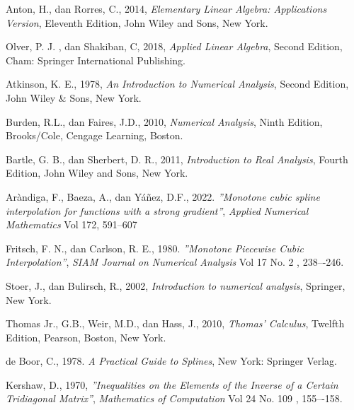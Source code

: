 \documentclass{skripsimathugm}
\begin{document}
\begin{thebibliography}{99}

Anton, H., dan Rorres, C., 2014, \emph{Elementary Linear Algebra: Applications Version}, Eleventh Edition, John Wiley and Sons, New York.

Olver, P. J. , dan Shakiban, C, 2018, \emph{Applied Linear Algebra}, Second Edition, Cham: Springer International Publishing.

Atkinson, K. E., 1978, \emph{An Introduction to Numerical Analysis}, Second Edition, John Wiley \& Sons, New York.

Burden, R.L., dan Faires, J.D., 2010, \emph{Numerical Analysis}, Ninth Edition, Brooks/Cole, Cengage Learning, Boston.

Bartle, G. B., dan Sherbert, D. R., 2011, \emph{Introduction to Real Analysis}, Fourth Edition,
John Wiley and Sons, New York.

Aràndiga, F., Baeza, A., dan  Yáñez, D.F., 2022.
\emph{''Monotone cubic spline interpolation for functions with a strong gradient''},
\emph{Applied Numerical Mathematics} Vol 172, 591--607

Fritsch, F. N., dan Carlson, R. E., 1980. \emph{''Monotone Piecewise Cubic Interpolation''}, \emph{SIAM Journal on Numerical Analysis} Vol 17 No. 2 , 238–-246.

Stoer, J., dan Bulirsch, R., 2002, \emph{Introduction to numerical analysis}, Springer, New York.

Thomas Jr., G.B., Weir, M.D., dan Hass, J., 2010, \emph{Thomas’ Calculus}, Twelfth Edition, Pearson, Boston, New York.

de Boor, C., 1978. \emph{A Practical Guide to Splines}, New York: Springer Verlag.

Kershaw, D., 1970, \emph{''Inequalities on the Elements of the Inverse of a Certain Tridiagonal Matrix''}, \emph{Mathematics of Computation} Vol 24 No. 109 , 155–-158.


\end{thebibliography}
\end{document}
